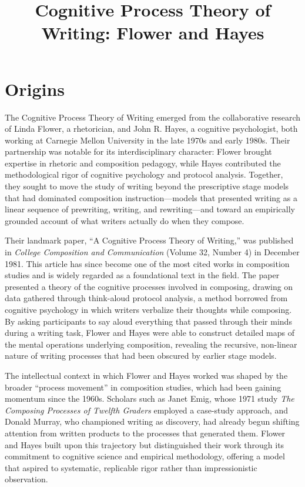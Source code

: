 \documentclass[12pt]{article}
\title{Cognitive Process Theory of Writing: Flower and Hayes}
\author{}
\date{}
\begin{document}
\maketitle

\section{Origins}

The Cognitive Process Theory of Writing emerged from the collaborative research of Linda Flower, a rhetorician, and John R. Hayes, a cognitive psychologist, both working at Carnegie Mellon University in the late 1970s and early 1980s. Their partnership was notable for its interdisciplinary character: Flower brought expertise in rhetoric and composition pedagogy, while Hayes contributed the methodological rigor of cognitive psychology and protocol analysis. Together, they sought to move the study of writing beyond the prescriptive stage models that had dominated composition instruction---models that presented writing as a linear sequence of prewriting, writing, and rewriting---and toward an empirically grounded account of what writers actually do when they compose.

Their landmark paper, ``A Cognitive Process Theory of Writing,'' was published in \textit{College Composition and Communication} (Volume 32, Number 4) in December 1981. This article has since become one of the most cited works in composition studies and is widely regarded as a foundational text in the field. The paper presented a theory of the cognitive processes involved in composing, drawing on data gathered through think-aloud protocol analysis, a method borrowed from cognitive psychology in which writers verbalize their thoughts while composing. By asking participants to say aloud everything that passed through their minds during a writing task, Flower and Hayes were able to construct detailed maps of the mental operations underlying composition, revealing the recursive, non-linear nature of writing processes that had been obscured by earlier stage models.

The intellectual context in which Flower and Hayes worked was shaped by the broader ``process movement'' in composition studies, which had been gaining momentum since the 1960s. Scholars such as Janet Emig, whose 1971 study \textit{The Composing Processes of Twelfth Graders} employed a case-study approach, and Donald Murray, who championed writing as discovery, had already begun shifting attention from written products to the processes that generated them. Flower and Hayes built upon this trajectory but distinguished their work through its commitment to cognitive science and empirical methodology, offering a model that aspired to systematic, replicable rigor rather than impressionistic observation.
\end{document}

